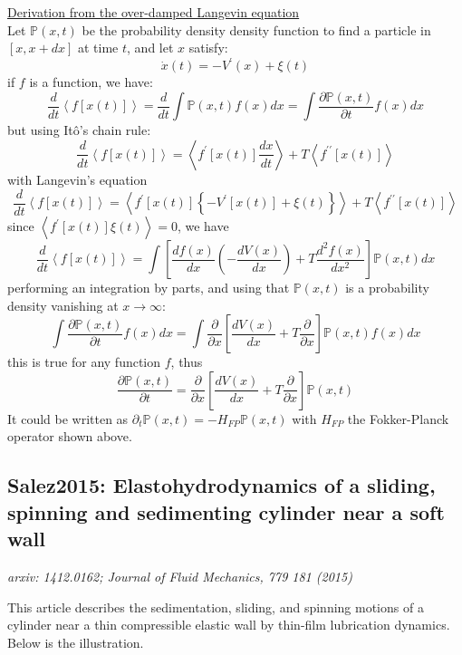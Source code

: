 \documentclass[books,12pt]{elegantpaper}
\newcommand{\bb}[1]{\mathbb{#1}}
\newcommand{\ssc}{\subsection}
\newcommand{\pder}[2][]{\frac{\partial#1}{\partial#2}}
\newcommand{\llang}{\left\langle}
\newcommand{\rrang}{\right\rangle}
\newcommand{\uu}{\underline}
\begin{document}
\uu{Derivation from the over-damped Langevin equation}\\
Let $\bb{P}(x,t)$ be the probability density density function to find a particle in $\left[x, x + dx\right]$ at time $t$, and let $x$ satisfy:
$$ \dot{x}(t) = -V^\prime(x) + \xi (t) $$
if $f$ is a function, we have:
$$ \frac{d}{dt} \llang f\left[ x(t) \right] \rrang = \frac{d}{dt} \int \bb{P}(x,t) f(x) dx = \int \pder[\bb{P}(x,t)]{t} f(x) dx $$
but using Itô's chain rule:
$$ \frac{d}{dt} \llang f\left[x(t)\right] \rrang = \llang f^\prime \left[ x(t) \right] \frac{dx}{dt} \rrang + T \llang f^{\prime\prime} \left[ x(t) \right] \rrang $$
with Langevin's equation
$$ \frac{d}{dt} \llang f\left[x(t)\right] \rrang = \llang f^\prime \left[ x(t) \right] \left\{ - V^\prime \left[ x(t) \right] + \xi(t) \right\} \rrang + T \llang f^{\prime\prime} \left[ x(t) \right] \rrang $$
since $\llang f^\prime \left[ x(t) \right] \xi(t) \rrang = 0$, we have
$$ \frac{d}{dt} \llang f \left[ x(t) \right] \rrang = \int \left[ \frac{df(x)}{dx} \left( - \frac{dV(x)}{dx} \right) + T \frac{d^2 f(x)}{dx^2} \right] \bb{P}(x,t) dx $$
performing an integration by parts, and using that $\bb{P}(x,t)$ is a probability density vanishing at $x\to\infty$:
$$ \int \pder[\bb{P}(x,t)]{t} f(x) dx = \int \pder{x} \left[ \frac{dV(x)}{dx} + T \pder{x} \right] \bb{P}(x,t) f(x) dx $$
this is true for any function $f$, thus
$$ \boxed{ \pder[\bb{P}(x,t)]{t} = \pder{x} \left[ \frac{dV(x)}{dx} + T \pder{x} \right] \bb{P}(x,t) } $$
It could be written as $\partial_t \bb{P}(x,t) = - H_{FP} \bb{P}(x,t)$ with $H_{FP}$ the Fokker-Planck operator shown above.





\ssc{Salez2015: Elastohydrodynamics of a sliding, spinning and sedimenting cylinder near a soft wall}
\label{ssc:Thomas}

\textit{arxiv: 1412.0162; Journal of Fluid Mechanics, 779 181 (2015)}

This article describes the sedimentation, sliding, and spinning motions of a cylinder near a thin compressible elastic wall by thin-film lubrication dynamics. Below is the illustration. 
\end{document}
